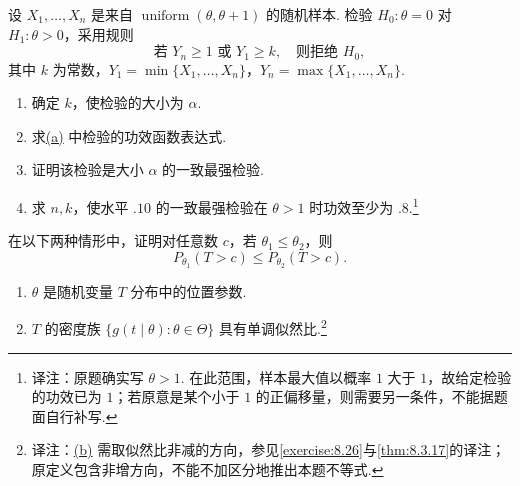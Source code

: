 \begin{exercise}\label{exercise:8.33}
设 $X_1,\ldots,X_n$ 是来自 $\operatorname{uniform}(\theta,\theta+1)$ 的随机样本. 检验 $H_0:\theta=0$ 对 $H_1:\theta>0$，采用规则
$$\text{若 }Y_n\ge1\text{ 或 }Y_1\ge k,\quad\text{则拒绝 }H_0,$$
其中 $k$ 为常数，$Y_1=\min\{X_1,\ldots,X_n\}$，$Y_n=\max\{X_1,\ldots,X_n\}$.
\begin{enumerate}
\item{}\label{itm:exercise:8.33:a} 确定 $k$，使检验的大小为 $\alpha$.
\item 求\hyperref[itm:exercise:8.33:a]{(a)} 中检验的功效函数表达式.
\item 证明该检验是大小 $\alpha$ 的一致最强检验.
\item 求 $n,k$，使水平 $.10$ 的一致最强检验在 $\theta>1$ 时功效至少为 $.8$.\footnote{译注：原题确实写 $\theta>1$. 在此范围，样本最大值以概率 $1$ 大于 $1$，故给定检验的功效已为 $1$；若原意是某个小于 $1$ 的正偏移量，则需要另一条件，不能据题面自行补写.}
\end{enumerate}
\end{exercise}
\begin{exercise}\label{exercise:8.34}
在以下两种情形中，证明对任意数 $c$，若 $\theta_1\le\theta_2$，则
$$P_{\theta_1}(T>c)\le P_{\theta_2}(T>c).$$
\begin{enumerate}
\item $\theta$ 是随机变量 $T$ 分布中的位置参数.
\item{}\label{itm:exercise:8.34:b} $T$ 的密度族 $\{g(t\mid\theta):\theta\in\Theta\}$ 具有单调似然比.\footnote{译注：\hyperref[itm:exercise:8.34:b]{(b)} 需取似然比非减的方向，参见\autoref{exercise:8.26}与\autoref{thm:8.3.17}的译注；原定义包含非增方向，不能不加区分地推出本题不等式.}
\end{enumerate}
\end{exercise}
